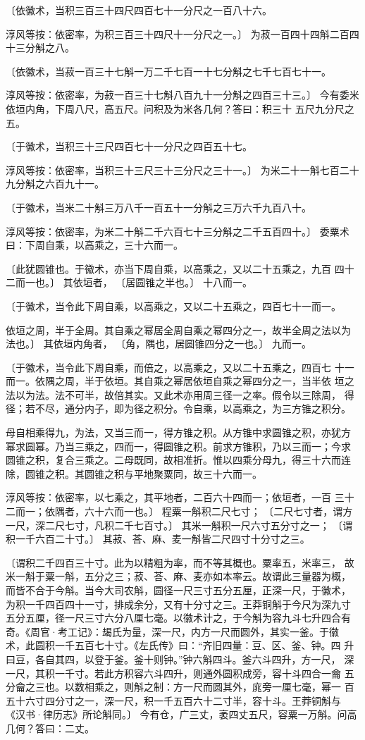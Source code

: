 \documentclass[a4paper,12pt,UTF8,twoside]{ctexbook}
\begin{document}
〔依徽术，当积三百三十四尺四百七十一分尺之一百八十六。

淳风等按：依密率，为积三百三十四尺十一分尺之一。〕 为菽一百四十四斛二百四十三分斛之八。

〔依徽术，当菽一百三十七斛一万二千七百一十七分斛之七千七百七十一。

淳风等按：依密率，为菽一百三十七斛八百九十一分斛之四百三十三。〕 今有委米依垣内角，下周八尺，高五尺。问积及为米各几何？答曰：积三十 五尺九分尺之五。

〔于徽术，当积三十三尺四百七十一分尺之四百五十七。

淳风等按：依密率，当积三十三尺三十三分尺之三十一。〕 为米二十一斛七百二十九分斛之六百九十一。

〔于徽术，当米二十斛三万八千一百五十一分斛之三万六千九百八十。

淳风等按：依密率，为米二十斛二千六百七十三分斛之二千五百四十。〕 委粟术曰：下周自乘，以高乘之，三十六而一。

〔此犹圆锥也。于徽术，亦当下周自乘，以高乘之，又以二十五乘之，九百 四十二而一也。〕 其依垣者， 〔居圆锥之半也。〕 十八而一。

〔于徽术，当令此下周自乘，以高乘之，又以二十五乘之，四百七十一而一。

依垣之周，半于全周。其自乘之幂居全周自乘之幂四分之一，故半全周之法以为 法也。〕 其依垣内角者， 〔角，隅也，居圆锥四分之一也。〕 九而一。

〔于徽术，当令此下周自乘，而倍之，以高乘之，又以二十五乘之，四百七 十一而一。依隅之周，半于依垣。其自乘之幂居依垣自乘之幂四分之一，当半依 垣之法以为法。法不可半，故倍其实。又此术亦用周三径一之率。假令以三除周， 得径；若不尽，通分内子，即为径之积分。令自乘，以高乘之，为三方锥之积分。

母自相乘得九，为法，又当三而一，得方锥之积。从方锥中求圆锥之积，亦犹方 幂求圆幂。乃当三乘之，四而一，得圆锥之积。前求方锥积，乃以三而一；今求 圆锥之积，复合三乘之。二母既同，故相准折。惟以四乘分母九，得三十六而连 除，圆锥之积。其圆锥之积与平地聚粟同，故三十六而一。

淳风等按：依密率，以七乘之，其平地者，二百六十四而一；依垣者，一百 三十二而一；依隅者，六十六而一也。〕 程粟一斛积二尺七寸； 〔二尺七寸者，谓方一尺，深二尺七寸，凡积二千七百寸。〕 其米一斛积一尺六寸五分寸之一； 〔谓积一千六百二十寸。〕 其菽、荅、麻、麦一斛皆二尺四寸十分寸之三。

〔谓积二千四百三十寸。此为以精粗为率，而不等其概也。粟率五，米率三， 故米一斛于粟一斛，五分之三；菽、荅、麻、麦亦如本率云。故谓此三量器为概， 而皆不合于今斛。当今大司农斛，圆径一尺三寸五分五厘，正深一尺，于徽术， 为积一千四百四十一寸，排成余分，又有十分寸之三。王莽铜斛于今尺为深九寸 五分五厘，径一尺三寸六分八厘七毫。以徽术计之，于今斛为容九斗七升四合有 奇。《周官·考工记》：朅氏为量，深一尺，内方一尺而圆外，其实一釜。于徽 术，此圆积一千五百七十寸。《左氏传》曰：“齐旧四量：豆、区、釜、钟。四 升曰豆，各自其四，以登于釜。釜十则钟。”钟六斛四斗。釜六斗四升，方一尺， 深一尺，其积一千寸。若此方积容六斗四升，则通外圆积成旁，容十斗四合一龠 五分龠之三也。以数相乘之，则斛之制：方一尺而圆其外，庣旁一厘七毫，幂一 百五十六寸四分寸之一，深一尺，积一千五百六十二寸半，容十斗。王莽铜斛与 《汉书·律历志》所论斛同。〕 今有仓，广三丈，袤四丈五尺，容粟一万斛。问高几何？答曰：二丈。
\end{document}
